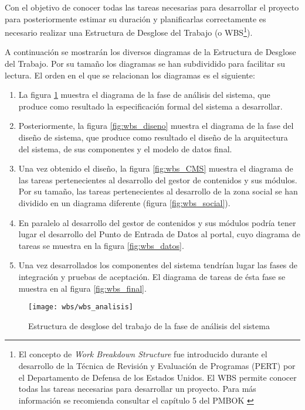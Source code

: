 Con el objetivo de conocer todas las tareas necesarias para desarrollar el proyecto para posteriormente estimar su duración y planificarlas correctamente es necesario realizar una Estructura de Desglose del Trabajo (o WBS\footnote{El concepto de \textit{Work Breakdown Structure} fue introducido durante el desarrollo de la Técnica de Revisión y Evaluación de Programas (PERT) por el Departamento de Defensa de los Estados Unidos.  El WBS permite conocer todas las tareas necesarias para desarrollar un proyecto.  Para más información se recomienda consultar el capítulo 5 del PMBOK \cite{pmi:pmbok}}).

A continuación se mostrarán los diversos diagramas de la Estructura de Desglose del Trabajo.  Por su tamaño los diagramas se han subdividido para facilitar su lectura.  El orden en el que se relacionan los diagramas es el siguiente:
\begin{enumerate}
	\item
		La figura \ref{fig:wbs_analisis} muestra el diagrama de la fase de análisis del sistema, que produce como resultado la especificación formal del sistema a desarrollar.
	\item
		Posteriormente, la figura \ref{fig:wbs_diseno} muestra el diagrama de la fase del diseño de sistema, que produce como resultado el diseño de la arquitectura del sistema, de sus componentes y el modelo de datos final.
	\item
		Una vez obtenido el diseño, la figura \ref{fig:wbs_CMS} muestra el diagrama de las tareas pertenecientes al desarrollo del gestor de contenidos y sus módulos.  Por su tamaño, las tareas pertenecientes al desarrollo de la zona social se han dividido en un diagrama diferente (figura \ref{fig:wbs_social}).
	\item
		En paralelo al desarrollo del gestor de contenidos y sus módulos podría tener lugar el desarrollo del Punto de Entrada de Datos al portal, cuyo diagrama de tareas se muestra en la figura \ref{fig:wbs_datos}.
	\item
		Una vez desarrollados los componentes del sistema tendrían lugar las fases de integración y pruebas de aceptación.  El diagrama de tareas de ésta fase se muestra en al figura \ref{fig:wbs_final}.
\end{enumerate}

\begin{figure}[h]
	\centering
	\texttt{[image: wbs/wbs\_analisis]}
	\caption{Estructura de desglose del trabajo de la fase de análisis del sistema}
	\label{fig:wbs_analisis}
\end{figure}

